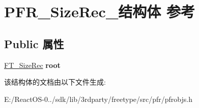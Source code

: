 \hypertarget{struct_p_f_r___size_rec__}{}\section{P\+F\+R\+\_\+\+Size\+Rec\+\_\+结构体 参考}
\label{struct_p_f_r___size_rec__}
\subsection*{Public 属性}
\begin{DoxyCompactItemize}
\item 
\mbox{\label{struct_p_f_r___size_rec___a625cb7bbd1515325c4114ec8f82c5ffe}} 
\hyperlink{struct_f_t___size_rec__}{F\+T\+\_\+\+Size\+Rec} {\bfseries root}
\end{DoxyCompactItemize}


该结构体的文档由以下文件生成\+:\begin{DoxyCompactItemize}
\item 
E\+:/\+React\+O\+S-\/0../sdk/lib/3rdparty/freetype/src/pfr/pfrobjs.\+h\end{DoxyCompactItemize}

